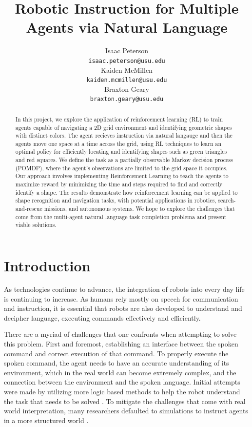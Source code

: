 \documentclass[11pt]{article}
\title{Robotic Instruction for Multiple Agents via Natural Language}
\author{Isaac Peterson \\
  \texttt{isaac.peterson@usu.edu} \\\And
  Kaiden McMillen \\
  \texttt{kaiden.mcmillen@usu.edu} \\\And 
  Braxton Geary \\
  \texttt{braxton.geary@usu.edu} 
  }
\begin{document}
\maketitle
\begin{abstract}
  In this project, we explore the application of reinforcement learning (RL) to train agents capable of navigating a 2D grid environment and identifying geometric shapes with distinct colors. The agent recieves instruction via natural langauge and then the agents move one space at a time across the grid, using RL techniques to learn an optimal policy for efficiently locating and identifying shapes such as green triangles and red squares. We define the task as a partially observable Markov decision process (POMDP), where the agent's observations are limited to the grid space it occupies. Our approach involves implementing Reinforcement Learning to teach the agents to maximize reward by minimizing the time and steps required to find and correctly identify a shape. The results demonstrate how reinforcement learning can be applied to shape recognition and navigation tasks, with potential applications in robotics, search-and-rescue missions, and autonomous systems. We hope to explore the challenges that come from the multi-agent natural language task completion problema and present viable solutions.

\end{abstract}

\section{Introduction}
As technologies continue to advance, the integration of robots into every day life is continuing to increase. As humans rely mostly on speech for communication and instruction, it is essential that robots are also developed to understand and decipher language, executing commands effectively and efficiently. 

There are a myriad of challenges that one confronts when attempting to solve this problem. First and foremost, establishing an interface between the spoken command and correct execution of that command. To properly execute the spoken command, the agent needs to have an accurate understanding of its environment, which in the real world can become extremely complex, and the connection between the environment and the spoken language. Initial attempts were made by utilizing more logic based methods to help the robot understand the task that needs to be solved \cite{Liu2016}. To mitigate the challenges that come with real world interpretation, many researchers defaulted to simulations to instruct agents in a more structured world \cite{Wang2024}.
\end{document}
